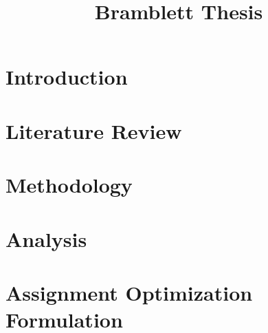 \documentclass[12pt,letterpaper,oneside]{book}
\title{Bramblett Thesis}
\theoremstyle{definition}
\begin{document}
\frontmatter
	\flyleaf
    \disclaimerpage
    \titlepageAFIT
    \committeepage
    
    
    \tableofcontents
    \listoffigures
    \listoftables
\mainmatter
	\chapter{Introduction}
	
    \chapter{Literature Review}
    
    \chapter{Methodology}
    
    \chapter{Analysis}
    
    \chapter{Assignment Optimization Formulation}
    
    \appendix
    
\backmatter
	\singlespace
	
	 
	\clearpage
%
\end{document}
